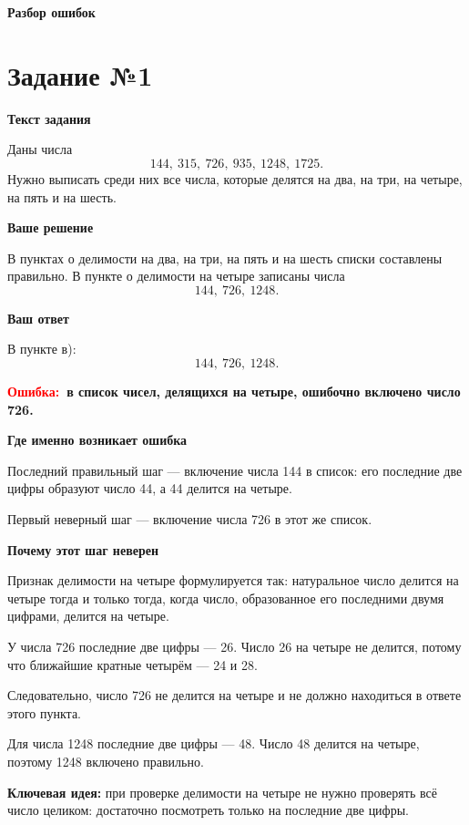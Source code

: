 \documentclass[12pt,a4paper]{article}
\newcommand{\err}{\textcolor{red}{Ошибка:}}
\newcommand{\idea}{\textcolor{blue!60!black}{Ключевая идея:}}
\begin{document}
\newpage
\thispagestyle{empty}
\vspace*{\fill}
\begin{center}
{\LARGE\bfseries Разбор ошибок}
\end{center}
\vspace*{\fill}

\newpage
{}\label{task:1}
\section*{Задание №1}

\textbf{Текст задания}

Даны числа
\[
144,\ 315,\ 726,\ 935,\ 1248,\ 1725.
\]
Нужно выписать среди них все числа, которые делятся на два, на три, на четыре, на пять и на шесть.

\textbf{Ваше решение}

В пунктах о делимости на два, на три, на пять и на шесть списки составлены правильно. В пункте о делимости на четыре записаны числа
\[
144,\ 726,\ 1248.
\]

\textbf{Ваш ответ}

В пункте в):
\[
144,\ 726,\ 1248.
\]

\textbf{\err\ в список чисел, делящихся на четыре, ошибочно включено число 726.}

\textbf{Где именно возникает ошибка}

Последний правильный шаг --- включение числа 144 в список: его последние две цифры образуют число 44, а 44 делится на четыре.

Первый неверный шаг --- включение числа 726 в этот же список.

\textbf{Почему этот шаг неверен}

Признак делимости на четыре формулируется так: натуральное число делится на четыре тогда и только тогда, когда число, образованное его последними двумя цифрами, делится на четыре.

У числа 726 последние две цифры --- 26. Число 26 на четыре не делится, потому что ближайшие кратные четырём --- 24 и 28.

Следовательно, число 726 не делится на четыре и не должно находиться в ответе этого пункта.

Для числа 1248 последние две цифры --- 48. Число 48 делится на четыре, поэтому 1248 включено правильно.

\textbf{\idea} при проверке делимости на четыре не нужно проверять всё число целиком: достаточно посмотреть только на последние две цифры.
\end{document}
